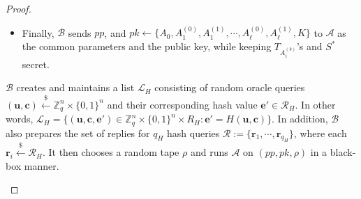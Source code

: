 \documentclass[runningheads]{llncs}
\def\cal{\mathcal}
\def\bf{\mathbf}
\begin{document}
\begin{proof}
\begin{description}
\begin{itemize}
\item Finally, $\cal{B}$  sends $pp$, and $pk \leftarrow \{ A_0, A_1^{(0)}, A_1^{(1)},  \cdots, A_{\ell}^{(0)}, A_{\ell}^{(1)}, K\}$ to $\cal{A}$ as the common parameters and the public key, while keeping $T_{A_i^{(b)}}$'s and $S^*$ secret.

\end{itemize}

$\mathcal{B}$ creates and maintains a list $\cal{L}_H$ consisting of random oracle queries 
$(\mathbf{u}, \bf{c})\xleftarrow{\$} \mathbb{Z}_q^{n} \times \{0,1\}^n$ and their corresponding hash value $ \mathbf{e}' \in \cal{R}_H$. In other words, $\cal{L}_H=\{(\mathbf{u}, \bf{c}, \bf{e}') \in  \mathbb{Z}_q^{n} \times \{0,1\}^n \times R_H: \bf{e}'=H(\mathbf{u}, \bf{c})\}$. In addition,  $\mathcal{B}$ also prepares the set of replies for $q_H$ hash queries $\mathcal{R}:=\{\mathbf{r}_1, \cdots, \mathbf{r}_{q_H} \} $, where each $\mathbf{r}_i \xleftarrow{\$} \cal{R}_H$. It then chooses a random tape $\rho$ and  runs $\mathcal{A}$ on $(pp, pk, \rho)$ in a black-box manner.



\end{description}
\end{proof}
\end{document}
